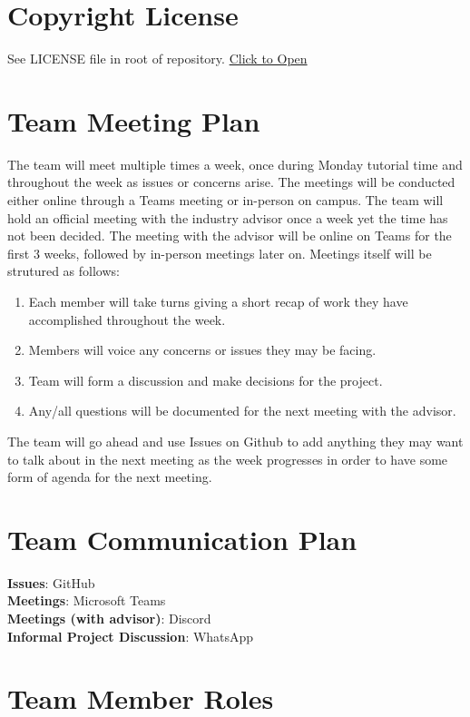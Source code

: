 \documentclass{article}
\begin{document}
\section{Copyright License}

See LICENSE file in root of repository.
\href{https://github.com/ssm-lab/capstone--source-code-optimizer/blob/main/LICENSE}{Click to Open}

\section{Team Meeting Plan}

The team will meet multiple times a week, once during Monday tutorial time and throughout the week as issues or concerns arise. The meetings will be conducted either online through a Teams meeting or in-person on campus. The team
will hold an official meeting with the industry advisor once a week yet the time has not been decided. The meeting with the advisor will be online on Teams for the first 3 weeks, followed by in-person meetings later on. Meetings itself will be strutured as follows:
\begin{enumerate}
  \item Each member will take turns giving a short recap of work they have accomplished throughout the week.
  \item Members will voice any concerns or issues they may be facing.
  \item Team will form a discussion and make decisions for the project.
  \item Any/all questions will be documented for the next meeting with the advisor.
\end{enumerate}
The team will go ahead and use Issues on Github to add anything they may want to talk about in the next meeting as the week progresses in order to have some form of agenda for the next meeting.

\section{Team Communication Plan}

\textbf{Issues}: GitHub \\
\textbf{Meetings}: Microsoft Teams \\
\textbf{Meetings (with advisor)}: Discord \\
\textbf{Informal Project Discussion}: WhatsApp

\section{Team Member Roles}
\end{document}
